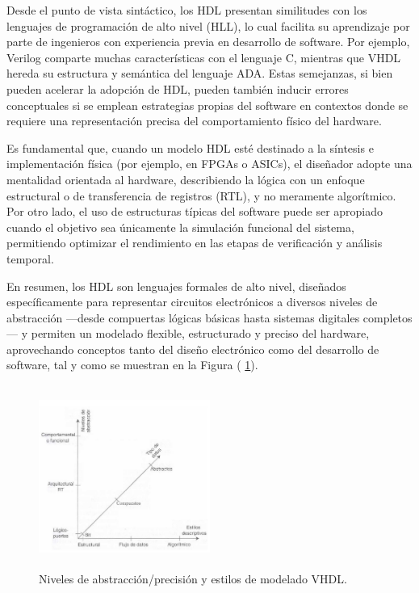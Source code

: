Desde el punto de vista sintáctico, los HDL presentan similitudes con los lenguajes de programación de alto nivel (HLL), lo cual facilita su aprendizaje por parte de ingenieros con experiencia previa en desarrollo de software. Por ejemplo, Verilog comparte muchas características con el lenguaje C, mientras que VHDL hereda su estructura y semántica del lenguaje ADA. Estas semejanzas, si bien pueden acelerar la adopción de HDL, pueden también inducir errores conceptuales si se emplean estrategias propias del software en contextos donde se requiere una representación precisa del comportamiento físico del hardware.

Es fundamental que, cuando un modelo HDL esté destinado a la síntesis e implementación física (por ejemplo, en FPGAs o ASICs), el diseñador adopte una mentalidad orientada al hardware, describiendo la lógica con un enfoque estructural o de transferencia de registros (RTL), y no meramente algorítmico. Por otro lado, el uso de estructuras típicas del software puede ser apropiado cuando el objetivo sea únicamente la simulación funcional del sistema, permitiendo optimizar el rendimiento en las etapas de verificación y análisis temporal.

En resumen, los HDL son lenguajes formales de alto nivel, diseñados específicamente para representar circuitos electrónicos a diversos niveles de abstracción —desde compuertas lógicas básicas hasta sistemas digitales completos— y permiten un modelado flexible, estructurado y preciso del hardware, aprovechando conceptos tanto del diseño electrónico como del desarrollo de software, tal y como se muestran en la Figura ( \ref{fig:imagen1}). 
\begin{figure}[h!] %
    \centering %
     \includegraphics[width=0.5\textwidth, height=6cm]{imagenes/img1} %
    \caption{Niveles de abstracción/precisión y estilos de modelado VHDL.}
    \label{fig:imagen1} %
\end{figure} 

